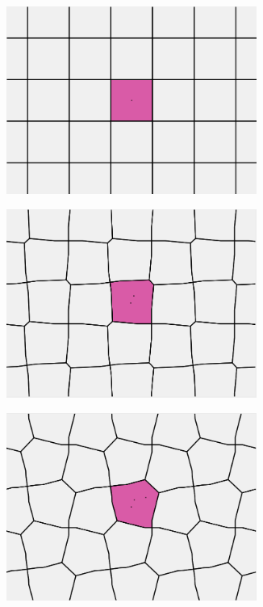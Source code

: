 \documentclass[12pt]{report}
\begin{document}
\begin{figure}[h]

  \begin{subfigure}[b]{0.323\textwidth}
    \includegraphics[width=0.9\textwidth]{s0.png}

  \end{subfigure}
  \begin{subfigure}[b]{0.323\textwidth}
    \includegraphics[width=0.9\textwidth]{s1.png}

  \end{subfigure}
  \begin{subfigure}[b]{0.323\textwidth}
    \includegraphics[width=0.9\textwidth]{s2.png}


\end{subfigure}
\end{figure}
\end{document}
